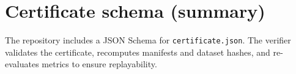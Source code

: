 \section{Certificate schema (summary)}
The repository includes a JSON Schema for \texttt{certificate.json}.
The verifier validates the certificate, recomputes manifests and dataset hashes, and re-evaluates metrics to ensure replayability.
